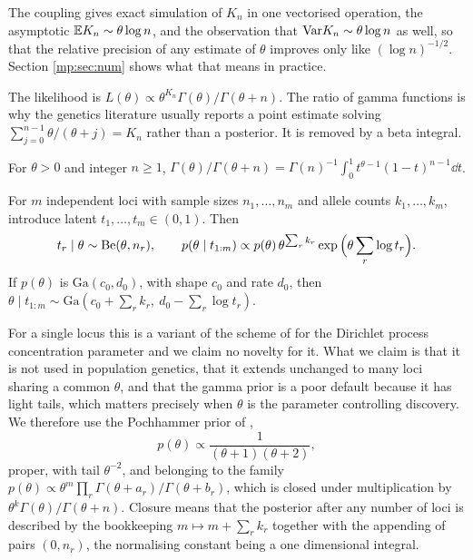 \noindent The coupling gives exact simulation of $K_n$ in one vectorised operation, the
asymptotic $\mathbb{E} K_n\sim\theta\log n$, and the observation that $\mathrm{Var} K_n\sim\theta\log n$ as
well, so that the relative precision of any estimate of $\theta$ improves only like
$(\log n)^{-1/2}$. Section \ref{mp:sec:num} shows what that means in practice.

The likelihood is $L(\theta)\propto\theta^{K_n}\Gamma(\theta)/\Gamma(\theta+n)$. The ratio of
gamma functions is why the genetics literature usually reports a point estimate solving
$\sum_{j=0}^{n-1}\theta/(\theta+j)=K_n$ rather than a posterior. It is removed by a beta
integral.

\begin{lemma}
\label{mp:lem:beta}
For $\theta>0$ and integer $n\ge1$,
$\Gamma(\theta)/\Gamma(\theta+n)=\Gamma(n)^{-1}\int_0^1t^{\theta-1}(1-t)^{n-1}\dd t$.
\end{lemma}

\begin{proposition}
\label{mp:prop:aug}
For $m$ independent loci with sample sizes $n_1,\dots,n_m$ and allele counts
$k_1,\dots,k_m$, introduce latent $t_1,\dots,t_m\in(0,1)$. Then
\[
t_r\mid\theta\sim\mathrm{Be}(\theta,n_r),\qquad
p(\theta\mid t_{1:m})\propto p(\theta)\,\theta^{\sum_rk_r}
\exp\Big(\theta\sum_r\log t_r\Big).
\]
If $p(\theta)$ is $\mathrm{Ga}(c_0,d_0)$, with shape $c_0$ and rate $d_0$, then
$\theta\mid t_{1:m}\sim\mathrm{Ga}(c_0+\sum_rk_r,\ d_0-\sum_r\log t_r)$.
\end{proposition}

For a single locus this is a variant of the scheme of \citet{mp:escobar1995} for the Dirichlet process
concentration parameter and we claim no novelty for it. What we claim is that it is not used
in population genetics, that it extends unchanged to many loci sharing a common $\theta$,
and that the gamma prior is a poor default because it has light tails, which matters
precisely when $\theta$ is the parameter controlling discovery. We therefore use the
Pochhammer prior of \citet{mp:wang2024},
\begin{equation}
p(\theta)\propto\frac{1}{(\theta+1)(\theta+2)},
\label{mp:eq:poch}
\end{equation}
proper, with tail $\theta^{-2}$, and belonging to the family
$p(\theta)\propto\theta^{m}\prod_r\Gamma(\theta+a_r)/\Gamma(\theta+b_r)$, which is closed
under multiplication by $\theta^{k}\Gamma(\theta)/\Gamma(\theta+n)$. Closure means that the
posterior after any number of loci is described by the bookkeeping
$m\mapsto m+\sum_rk_r$ together with the appending of pairs $(0,n_r)$, the normalising
constant being a one dimensional integral.

